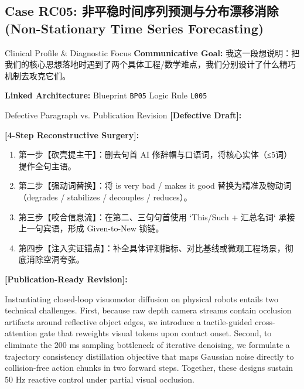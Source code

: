 \subsection{Case RC05: 非平稳时间序列预测与分布漂移消除 (Non-Stationary Time Series Forecasting)}\label{case:RC05}
\begin{ConceptBox}{Clinical Profile \& Diagnostic Focus}
\textbf{Communicative Goal:} 我这一段想说明：把我们的核心思想落地时遇到了两个具体工程/数学难点，我们分别设计了什么精巧机制去攻克它们。\par
\textbf{Linked Architecture:} Blueprint \texttt{BP05} \enspace\textbar\enspace Logic Rule \texttt{L005}
\end{ConceptBox}
\begin{ExampleBox}{Defective Paragraph vs. Publication Revision}
\textbf{\color{TargetHighlight}[Defective Draft]:}\par
{}\par\vspace{6pt}
\textbf{\color{AcadForest}[4-Step Reconstructive Surgery]:}
\begin{enumerate}[label=\textbf{\color{AcadNavy}Step \arabic*:}, leftmargin=2em]
  \item 第一步【砍壳提主干】：删去句首 AI 修辞帽与口语词，将核心实体（≤5词）提作全句主语。
  \item 第二步【强动词替换】：将 is very bad / makes it good 替换为精准及物动词（degrades / stabilizes / decouples / reduces）。
  \item 第三步【咬合信息流】：在第二、三句句首使用 `This/Such + 汇总名词` 承接上一句宾语，形成 Given-to-New 锁链。
  \item 第四步【注入实证锚点】：补全具体评测指标、对比基线或微观工程场景，彻底消除空洞夸张。
\end{enumerate}\vspace{4pt}
\textbf{\color{AcadNavy}[Publication-Ready Revision]:}\par
Instantiating closed-loop visuomotor diffusion on physical robots entails two technical challenges. First, because raw depth camera streams contain occlusion artifacts around reflective object edges, we introduce a tactile-guided cross-attention gate that reweights visual tokens upon contact onset. Second, to eliminate the 200 ms sampling bottleneck of iterative denoising, we formulate a trajectory consistency distillation objective that maps Gaussian noise directly to collision-free action chunks in two forward steps. Together, these designs sustain 50 Hz reactive control under partial visual occlusion.
\end{ExampleBox}

